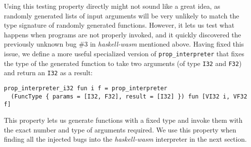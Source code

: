\documentclass[sigconf, anonymous, review]{acmart}
\newcommand{\mutagen}{\textsc{Mutagen}\xspace}
\begin{document}
Using this testing property directly might not sound like a great idea, as
randomly generated lists of input arguments will be very unlikely to match the
type signature of randomly generated functions.
%
However, it lets us test what happens when programs are not properly invoked,
and it quickly discovered the previously unknown bug \#3 in
\textit{haskell-wasm} mentioned above.
%
Having fixed this issue, we define a more useful specialized version of
\texttt{prop\_interpreter} that fixes the type of the generated function to take
two arguments (of type \texttt{I32} and \texttt{F32}) and return an \texttt{I32}
as a result:

\begin{verbatim}
prop_interpreter_i32 fun i f = prop_interpreter
  (FuncType { params = [I32, F32], result = [I32] }) fun [VI32 i, VF32 f]
\end{verbatim}

\noindent This property lets us generate functions with a fixed type and invoke
them with the exact number and type of arguments required.
%
%
We use this property when finding all the injected bugs into the
\textit{haskell-wasm} interpreter in the next section.
%


\end{document}
